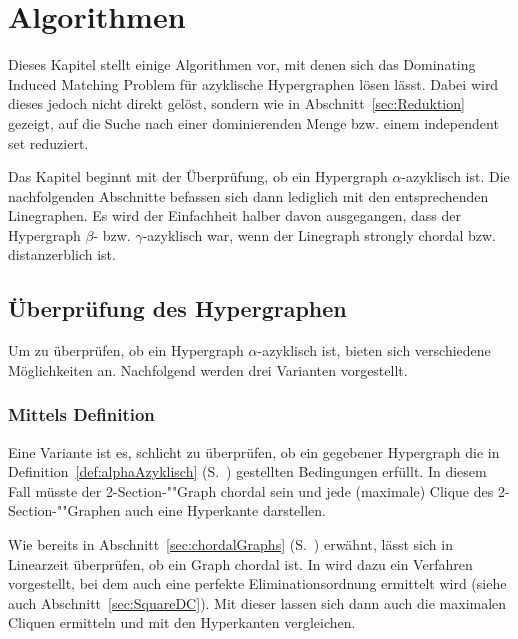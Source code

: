 \chapter{Algorithmen}


Dieses Kapitel stellt einige Algorithmen vor, mit denen sich das Dominating Induced Matching Problem für azyklische Hypergraphen lösen lässt. Dabei wird dieses jedoch nicht direkt gelöst, sondern wie in Abschnitt~\ref{sec:Reduktion} gezeigt, auf die Suche nach einer dominierenden Menge bzw. einem independent set reduziert.


Das Kapitel beginnt mit der Überprüfung, ob ein Hypergraph $\alpha$-azyklisch ist. Die nachfolgenden Abschnitte befassen sich dann lediglich mit den entsprechenden Linegraphen. Es wird der Einfachheit halber davon ausgegangen, dass der Hypergraph $\beta$- bzw. $\gamma$-azyklisch war, wenn der Linegraph strongly chordal bzw. distanzerblich ist.

\section{Überprüfung des Hypergraphen}
Um zu überprüfen, ob ein Hypergraph $\alpha$-azyklisch ist, bieten sich verschiedene Möglichkeiten an. Nachfolgend werden drei Varianten vorgestellt.

\subsection{Mittels Definition}
Eine Variante ist es, schlicht zu überprüfen, ob ein gegebener Hypergraph die in Definition~\ref{def:alphaAzyklisch} (S.~\pageref{def:alphaAzyklisch}) gestellten Bedingungen erfüllt. In diesem Fall müsste der 2-Section-""Graph chordal sein und jede (maximale) Clique des 2-Section-""Graphen auch eine Hyperkante darstellen.

Wie bereits in Abschnitt~\ref{sec:chordalGraphs} (S.~\pageref{sec:chordalGraphs}) erwähnt, lässt sich in Linearzeit überprüfen, ob ein Graph chordal ist. In \cite{Rose1976} wird dazu ein Verfahren vorgestellt, bei dem auch eine perfekte Eliminationsordnung ermittelt wird (siehe auch Abschnitt~\ref{sec:SquareDC}). Mit dieser lassen sich dann auch die maximalen Cliquen ermitteln und mit den Hyperkanten vergleichen.

